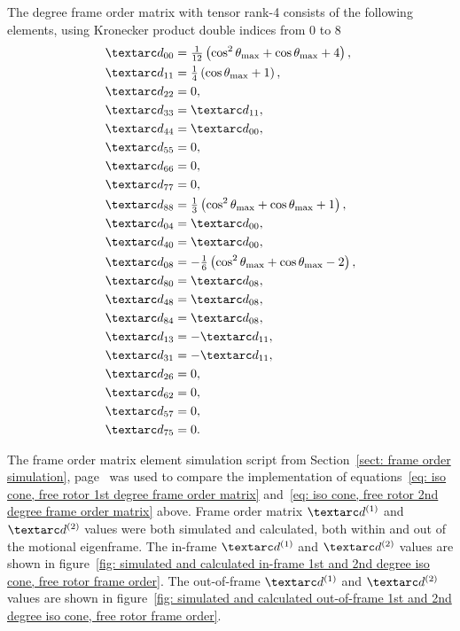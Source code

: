 The  degree frame order matrix with tensor rank-4 consists of the following elements, using Kronecker product double indices from 0 to 8
\begin{subequations} \label{eq: iso cone, free rotor 2nd degree frame order matrix}
\begin{align}
    &\FO_{00} = \tfrac{1}{12} \left( \cos^2\conethetamax + \cos\conethetamax + 4 \right) , \\
    &\FO_{11} = \tfrac{1}{4} \left( \cos\conethetamax + 1 \right) , \\
    &\FO_{22} = 0 , \\
    &\FO_{33} = \FO_{11} , \\
    &\FO_{44} = \FO_{00} , \\
    &\FO_{55} = 0 , \\
    &\FO_{66} = 0 , \\
    &\FO_{77} = 0 , \\
    &\FO_{88} = \tfrac{1}{3} \left( \cos^2\conethetamax + \cos\conethetamax + 1 \right) , \\
    &\FO_{04} = \FO_{00} , \\
    &\FO_{40} = \FO_{00} , \\
    &\FO_{08} = -\tfrac{1}{6} \left( \cos^2\conethetamax + \cos\conethetamax - 2 \right) , \\
    &\FO_{80} = \FO_{08} , \\
    &\FO_{48} = \FO_{08} , \\
    &\FO_{84} = \FO_{08} , \\
    &\FO_{13} = -\FO_{11} , \\
    &\FO_{31} = -\FO_{11} , \\
    &\FO_{26} = 0 , \\
    &\FO_{62} = 0 , \\
    &\FO_{57} = 0 , \\
    &\FO_{75} = 0 .
\end{align}
\end{subequations}



The frame order matrix element simulation script from Section~\ref{sect: frame order simulation}, page~\pageref{sect: frame order simulation} was used to compare the implementation of equations~\ref{eq: iso cone, free rotor 1st degree frame order matrix} and~\ref{eq: iso cone, free rotor 2nd degree frame order matrix} above.
Frame order matrix $\FOone$ and $\FOtwo$ values were both simulated and calculated, both within and out of the motional eigenframe.
The in-frame $\FOone$ and $\FOtwo$ values are shown in figure~\ref{fig: simulated and calculated in-frame 1st and 2nd degree iso cone, free rotor frame order}.
The out-of-frame $\FOone$ and $\FOtwo$ values are shown in figure~\ref{fig: simulated and calculated out-of-frame 1st and 2nd degree iso cone, free rotor frame order}.




